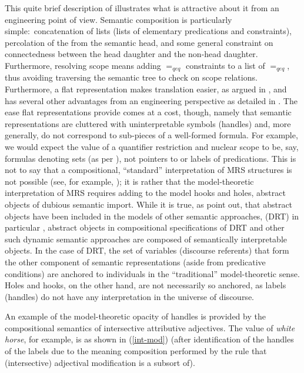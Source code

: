 \documentclass[output=paper
 	        ,biblatex
                ,babelshorthands
                ,newtxmath
                ,draftmode
                ,colorlinks, citecolor=brown
]{langscibook}
\begin{document}
This quite brief description of  illustrates what is attractive about it from an
engineering point of view. Semantic composition is particularly simple:\ concatenation of lists
(lists of elementary predications and constraints), percolation of the  from the
semantic head, and some general constraint on connectedness between the head daughter and the
non-head daughter. Furthermore, resolving scope means adding $=_{qeq}$ constraints to a list of
$=_{qeq}$, thus avoiding traversing the semantic tree to check on scope relations. Furthermore, a
flat representation makes translation easier, as argued in \citet{Copestakeetal1995}, and has
several other advantages from an engineering perspective as detailed in \citet{Copestake2009}. The
ease flat representations provide comes at a cost, though, namely that semantic representations are
cluttered with uninterpretable symbols (handles) and, more generally, do not correspond to
sub-pieces of a well-formed formula. For example, we would expect the value of a quantifier
restriction and nuclear scope to be, say, formulas denoting sets (as per
\citealt{BarwiseandCooper1981}), not pointers to or labels of predications. This is not to say that
a compositional, ``standard'' interpretation of MRS structures is not possible (see, for example,
\citealt{Copestakeetal2001}); it is rather that the model-theoretic interpretation of MRS requires
adding to the model hooks and holes, abstract objects of dubious semantic import. While it is true,
as \citeauthor{Copestakeetal2005} point out, that abstract objects have been included in the models
of other semantic approaches,  (DRT) in particular \citep{Zeevat1989}, abstract objects in
compositional specifications of DRT and other such dynamic semantic approaches are composed of
semantically interpretable objects. In the case of DRT, the set of variables (discourse referents)
that form the other component of semantic representations (aside from predicative conditions) are
anchored to individuals in the ``traditional'' model-theoretic sense. Holes and hooks, on the other
hand, are not necessarily so anchored, as labels (handles) do not have any interpretation in the
universe of discourse.


An example of the model-theoretic opacity of handles is provided by the compositional semantics of intersective attributive adjectives. The  value of \emph{white horse}, for example, is as shown in (\ref{int-mod}) (after identification of the handles of the labels due to the meaning composition performed by the  rule that (intersective) adjectival modification is a subsort of).
\end{document}
